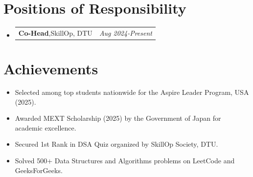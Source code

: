 \documentclass[a4paper,12pt]{article}
\makeatletter
\newcommand{\resumePOR}[3]{
\vspace{0.5mm}\item
    \begin{tabular*}{0.97\textwidth}[t]{l@{\extracolsep{\fill}}r}
        \textbf{#1},\hspace{0.3mm}#2 & \textit{\small{#3}} 
    \end{tabular*}
    \vspace{-2mm}
}
\newcommand{\resumeSubheading}[4]{
\vspace{0.5mm}\item
    \begin{tabular*}{0.98\textwidth}[t]{l@{\extracolsep{\fill}}r}
        \textbf{#1} & \textit{\footnotesize{#4}} \\
        \textit{\footnotesize{#3}} &  \footnotesize{#2}\\
    \end{tabular*}
    \vspace{-2.4mm}
}
\newcommand{\resumeSubHeadingListStart}{\begin{itemize}[leftmargin=*,labelsep=0mm]}
\newcommand{\resumeItemListStart}{\begin{justify}\begin{itemize}[leftmargin=3ex, rightmargin=2ex, noitemsep,labelsep=1.2mm,itemsep=0mm]\small}
\newcommand{\resumeSubHeadingListEnd}{\end{itemize}\vspace{2mm}}
\newcommand{\resumeItemListEnd}{\end{itemize}\end{justify}\vspace{-2mm}}
\makeatother
\begin{document}

\section{\textbf{Positions of Responsibility}}
\vspace{-0.4mm}
\resumeSubHeadingListStart

\resumePOR
{Co-Head}
{SkillOp, DTU}
{Aug 2024-Present}

\resumeSubHeadingListEnd
\vspace{-4mm}

\section{\textbf{Achievements}}
\vspace{-0.1mm}
\resumeItemListStart
\item Selected among top students nationwide for the Aspire Leader Program, USA (2025).
\item Awarded MEXT Scholarship (2025) by the Government of Japan for academic excellence.
\item Secured 1st Rank in DSA Quiz organized by SkillOp Society, DTU.
\item Solved 500+ Data Structures and Algorithms problems on LeetCode and GeeksForGeeks.
\resumeItemListEnd

\end{document}
